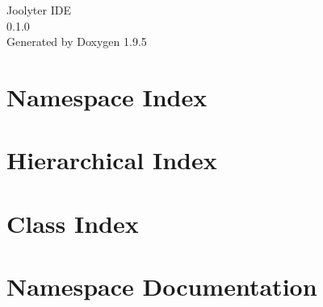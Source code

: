 \documentclass[twoside]{book}
\newcommand{\+}{\discretionary{\mbox{\scriptsize$\hookleftarrow$}}{}{}}
\newcommand{\clearemptydoublepage}{%
    \newpage{\pagestyle{empty}\cleardoublepage}%
  }
\begin{document}
  \raggedbottom
    \hypersetup{pageanchor=false,
                bookmarksnumbered=true,
                pdfencoding=unicode
               }
  \begin{titlepage}
  \vspace*{7cm}
  \begin{center}%
  {\Large Joolyter IDE}\\
  [1ex]\large 0.\+1.\+0 \\
  \vspace*{1cm}
  {\large Generated by Doxygen 1.9.5}\\
  \end{center}
  \end{titlepage}
  \clearemptydoublepage
  \tableofcontents
  \clearemptydoublepage
  \hypersetup{pageanchor=true}
\chapter{Namespace Index}

\chapter{Hierarchical Index}

\chapter{Class Index}

\chapter{Namespace Documentation}






\end{document}
